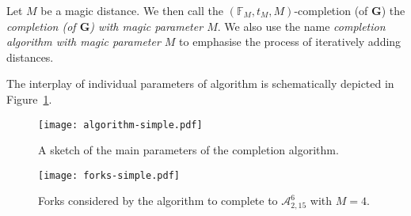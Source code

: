 \documentclass[11pt]{amsart}
\def\str#1{\mathbf {#1}}
\begin{document}
\begin{definition}
Let $M$ be a ma\-gic distance. We then call the $(\mathbb F_M,t_M,M)$-completion (of $\str{G}$) the {\em completion (of $\str{G}$) with magic parameter $M$}.
 We also use the name {\em completion algorithm with magic parameter $M$} to emphasise the process of iteratively adding distances.
\end{definition}
The
interplay of individual parameters of algorithm is schematically depicted in
Figure~\ref{fig:algorithm}.
\begin{figure}
\centering
\texttt{[image: algorithm-simple.pdf]}
\caption{A sketch of the main parameters of the completion algorithm.}
\label{fig:algorithm}
\end{figure}%
\begin{figure}
\centering
\texttt{[image: forks-simple.pdf]}
\caption{Forks considered by the algorithm to complete to $\mathcal A^6_{2,15}$ with $M=4$.}
\label{fig:forks}
\end{figure}%
\end{document}
